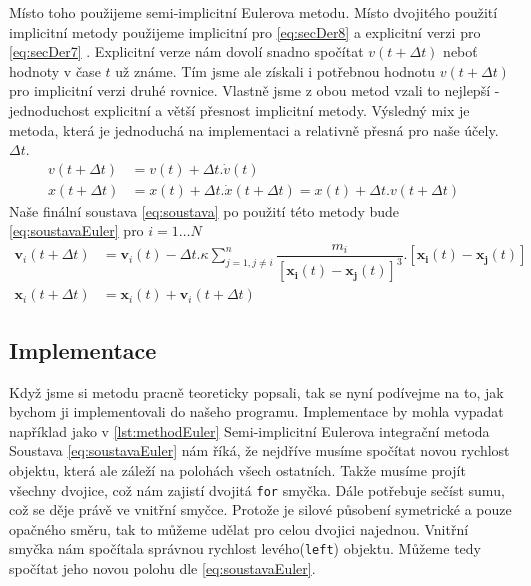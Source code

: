 Místo toho použijeme semi-implicitní Eulerova metodu. Místo dvojitého použití implicitní metody použijeme implicitní pro \eqref{eq:secDer8} a explicitní verzi pro \eqref{eq:secDer7} . Explicitní verze nám dovolí snadno spočítat $ v(t + \Delta t) $ neboť hodnoty v čase $ t $ už známe. Tím jsme ale získali i potřebnou hodnotu $ v(t + \Delta t) $ pro implicitní verzi druhé rovnice. Vlastně jsme z obou metod vzali to nejlepší - jednoduchost explicitní a větší přesnost implicitní metody. Výsledný mix je metoda, která je jednoduchá na implementaci a relativně přesná pro naše účely. $ \Delta t $.
\begin{align}
\label{eq:secDer7}
v(t + \Delta t)&=v(t) + \Delta t . \dot{v}(t)\\
\label{eq:secDer8}
x(t+\Delta t) &= x(t) + \Delta t. \dot{x}(t + \Delta t) = x(t) + \Delta t.v(t + \Delta t)\quad
\end{align}
Naše finální soustava \eqref{eq:soustava} po použití této metody bude \eqref{eq:soustavaEuler} pro $ i=1 \dots N $
\begin{subequations}\label{eq:soustavaEuler}
\begin{align}
\boldsymbol {v}_i(t+\Delta t) &=\boldsymbol{{v}}_i(t)  - \Delta t . \kappa \sum_{j=1,j \neq i}^{n}\dfrac{m_i}
{\left[ \boldsymbol{x_i}(t) - \boldsymbol{x_j}(t)\right] ^3} . 
\left[ \boldsymbol{x_i}(t) - \boldsymbol{x_j}(t)\right] \\
\boldsymbol {x}_i(t+\Delta t)& =\boldsymbol{{x}}_i(t)  +\boldsymbol {v}_i(t+\Delta t)
\end{align}
\end{subequations}
\subsection{Implementace}
Když jsme si metodu pracně teoreticky popsali, tak se nyní podívejme na to, jak bychom ji implementovali do našeho programu. Implementace by mohla vypadat například jako v \ref{lst:methodEuler}
{Semi-implicitní Eulerova integrační metoda}
Soustava \ref{eq:soustavaEuler} nám říká, že nejdříve musíme spočítat novou rychlost objektu, která ale záleží na polohách všech ostatních. Takže musíme projít všechny dvojice, což nám zajistí dvojitá \texttt{for} smyčka. Dále potřebuje sečíst sumu, což se děje právě ve vnitřní smyčce. Protože je silové působení symetrické a pouze opačného směru, tak to můžeme udělat pro celou dvojici najednou.
Vnitřní smyčka nám spočítala správnou rychlost levého(\texttt{left}) objektu.
Můžeme tedy spočítat jeho novou polohu dle \eqref{eq:soustavaEuler}.

